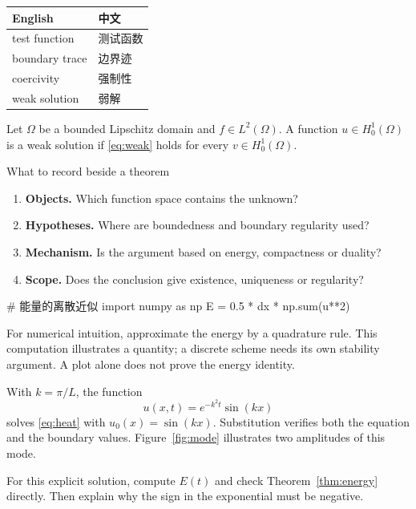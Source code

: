 \begin{margintable}
  \caption{A compact glossary / 术语表}\label{tab:glossary}
  \begin{smalltable}
    \begin{tabular}{@{}ll@{}}
      \toprule
      English & 中文\\\midrule
      test function & 测试函数\\
      boundary trace & 边界迹\\
      coercivity & 强制性\\
      weak solution & 弱解\\\bottomrule
    \end{tabular}
  \end{smalltable}
\end{margintable}
\begin{definition}\label{def:weak}
Let $\Omega$ be a bounded Lipschitz domain and $f\in L^2(\Omega)$.
A function $u\in H_0^1(\Omega)$ is a weak solution if
\eqref{eq:weak} holds for every $v\in H_0^1(\Omega)$.
\end{definition}

\begin{readingbox}{What to record beside a theorem}
\begin{enumerate}
  \item \textbf{Objects.} Which function space contains the unknown?
  \item \textbf{Hypotheses.} Where are boundedness and boundary regularity used?
  \item \textbf{Mechanism.} Is the argument based on energy, compactness or duality?
  \item \textbf{Scope.} Does the conclusion give existence, uniqueness or regularity?
\end{enumerate}
\end{readingbox}

\begin{margincode}[language=Python]
# 能量的离散近似
import numpy as np
E = 0.5 * dx * np.sum(u**2)
\end{margincode}
For numerical intuition, approximate the energy by a quadrature rule.
This computation illustrates a quantity; a discrete scheme needs its
own stability argument. A plot alone does not prove the energy identity.

\begin{example}
With $k=\pi/L$, the function
\[
  u(x,t)=e^{-k^2t}\sin(kx)
\]
solves \eqref{eq:heat} with $u_0(x)=\sin(kx)$. Substitution verifies
both the equation and the boundary values. Figure~\ref{fig:mode}
illustrates two amplitudes of this mode.
\end{example}
\begin{exercise}
For this explicit solution, compute $E(t)$ and check
Theorem~\ref{thm:energy} directly. Then explain why the sign in the
exponential must be negative.
\end{exercise}

